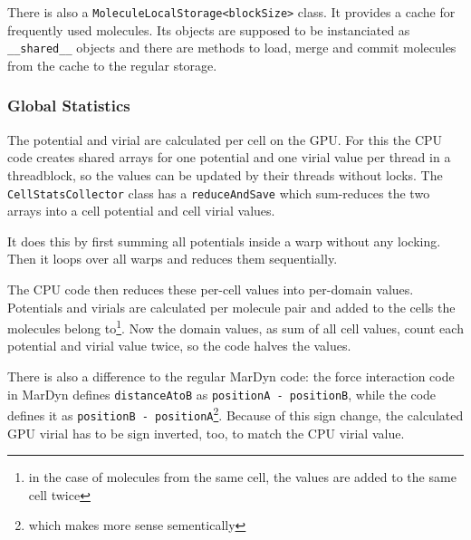 There is also a \lstinline!MoleculeLocalStorage<blockSize>! class. It provides a cache for frequently used molecules. Its objects are supposed to be instanciated as \lstinline!__shared__! objects and there are methods to load, merge and commit molecules from the cache to the regular storage.

\subsubsection{Global Statistics}
The potential and virial are calculated per cell on the GPU. For this the CPU code creates shared arrays for one potential and one virial value per thread in a threadblock, so the values can be updated by their threads without locks. The \lstinline!CellStatsCollector! class has a \lstinline!reduceAndSave! which sum-reduces the two arrays into a cell potential and cell virial values.

It does this by first summing all potentials inside a warp without any locking. Then it loops over all warps and reduces them sequentially.

The CPU code then reduces these per-cell values into per-domain values. Potentials and virials are calculated per molecule pair and added to the cells the molecules belong to\footnote{in the case of molecules from the same cell, the values are added to the same cell twice}. Now the domain values, as sum of all cell values, count each potential and virial value twice, so the code halves the values.

There is also a difference to the regular MarDyn code: the force interaction code in MarDyn defines \lstinline!distanceAtoB! as \lstinline!positionA - positionB!, while the \cuda{} code defines it as \lstinline!positionB - positionA!\footnote{which makes more sense sementically}. Because of this sign change, the calculated GPU virial has to be sign inverted, too, to match the CPU virial value.

